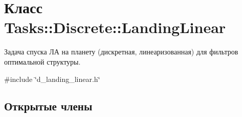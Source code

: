 \hypertarget{class_tasks_1_1_discrete_1_1_landing_linear}{}\section{Класс Tasks\+:\+:Discrete\+:\+:Landing\+Linear}
\label{class_tasks_1_1_discrete_1_1_landing_linear}


Задача спуска ЛА на планету (дискретная, линеаризованная) для фильтров оптимальной структуры.  




{\ttfamily \#include \char`\"{}d\+\_\+landing\+\_\+linear.\+h\char`\"{}}

\subsection*{Открытые члены}

